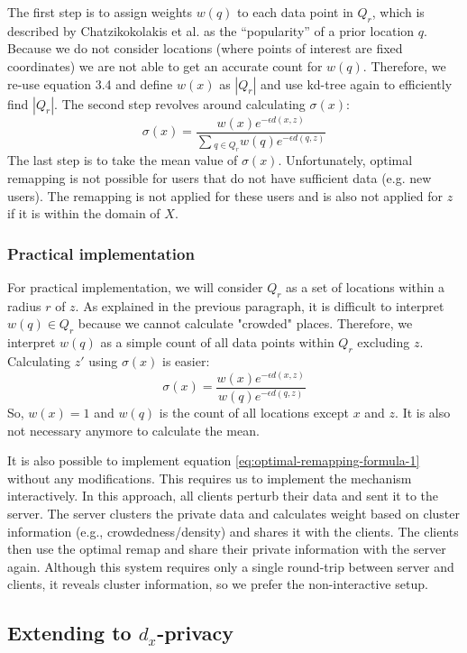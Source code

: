 The first step is to assign weights $w(q) $ to each data point in $Q_r$, which is described by Chatzikokolakis et al. as the “popularity” of a prior location $q$.
Because we do not consider locations (where points of interest are fixed coordinates) we are not able to get an accurate count for $w(q)$.
Therefore, we re-use equation 3.4 and define $ w(x)$ as $ |Q_r|$ and use kd-tree again to efficiently find $|Q_r|$.
The second step revolves around calculating $\sigma(x)$:
\begin{equation}
  \sigma(x) = \frac{w(x)e^{-\epsilon d(x, z)}}{\sum{_{q\in Q_r} w(q)e^{-\epsilon d(q, z)}}}
  \label{eq:optimal-remapping-formula-1}
\end{equation}
The last step is to take the mean value of $\sigma(x)$.
Unfortunately, optimal remapping is not possible for users that do not have sufficient data (e.g. new users).
The remapping is not applied for these users and is also not applied for $z$ if it is within the domain of $X$.

\subsubsection{Practical implementation}
For practical implementation, we will consider $Q_r$ as a set of locations within a radius $r$ of $z$.
As explained in the previous paragraph, it is difficult to interpret $w(q) \in Q_r$ because we cannot calculate "crowded" places.
Therefore, we interpret $w(q)$ as a simple count of all data points within $Q_r$ excluding $z$. Calculating $z'$ using $\sigma(x)$ is easier:
\begin{equation}
  \sigma(x) = \frac{w(x)e^{-\epsilon d(x, z)}}{w(q)e^{-\epsilon d(q, z)}}
  \label{eq:optimal-remapping-formula-2}
\end{equation}
So, $w(x) = 1$ and $w(q)$ is the count of all locations except $x$ and $z$. It is also not necessary anymore to calculate the mean.

It is also possible to implement equation \ref{eq:optimal-remapping-formula-1} without any modifications.
This requires us to implement the mechanism interactively.
In this approach, all clients perturb their data and sent it to the server.
The server clusters the private data and calculates weight based on cluster information (e.g., crowdedness/density) and shares it with the clients.
The clients then use the optimal remap and share their private information with the server again.
Although this system requires only a single round-trip between server and clients, it reveals cluster information, so we prefer the non-interactive setup.

\subsection{Extending to $d_x$-privacy}
